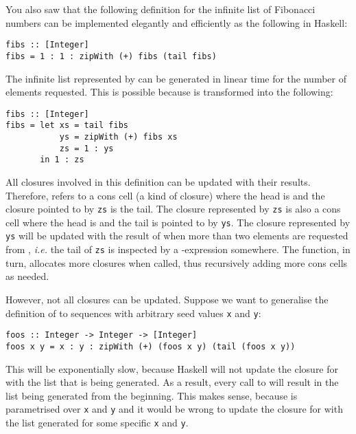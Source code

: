 \taskLine

You also saw that the following definition for the infinite list of Fibonacci numbers can be implemented elegantly and efficiently as the following in Haskell:
\begin{verbatim}
fibs :: [Integer]
fibs = 1 : 1 : zipWith (+) fibs (tail fibs)
\end{verbatim}
The infinite list represented by  can be generated in linear time for the number of elements requested. This is possible because  is transformed into the following:
\begin{verbatim}
fibs :: [Integer]
fibs = let xs = tail fibs 
           ys = zipWith (+) fibs xs
           zs = 1 : ys
       in 1 : zs
\end{verbatim}
All closures involved in this definition can be updated with their results. Therefore,  refers to a cons cell (a kind of closure) where the head is  and the closure pointed to by \texttt{\small zs} is the tail. The closure represented by \texttt{\small zs} is also a cons cell where the head is  and the tail is pointed to by \texttt{\small ys}. The closure represented by \texttt{\small ys} will be updated with the result of  when more than two elements are requested from , \emph{i.e.} the tail of \texttt{\small zs} is inspected by a -expression somewhere. The  function, in turn, allocates more closures when called, thus recursively adding more cons cells as needed.

However, not all closures can be updated. Suppose we want to generalise the definition of  to sequences with arbitrary seed values \texttt{\small x} and \texttt{\small y}:
\begin{verbatim}
foos :: Integer -> Integer -> [Integer]
foos x y = x : y : zipWith (+) (foos x y) (tail (foos x y))
\end{verbatim}
This will be exponentially slow, because Haskell will not update the closure for  with the list that is being generated. As a result, every call to  will result in the list being generated from the beginning. This makes sense, because  is parametrised over \texttt{\small x} and \texttt{\small y} and it would be wrong to update the closure for  with the list generated for some specific \texttt{\small x} and \texttt{\small y}. 

